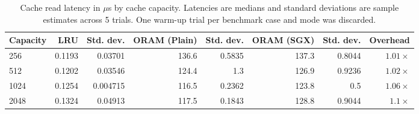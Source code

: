 \begin{table}
\centering
\small
\setlength{\tabcolsep}{4pt}
\begin{tabular}{lrrrrrrr}
\toprule
Capacity & LRU & Std. dev. & ORAM (Plain) & Std. dev. & ORAM (SGX) & Std. dev. & Overhead \\
\midrule
256 & 0.1193 & 0.03701 & 136.6 & 0.5835 & 137.3 & 0.8044 & $1.01\times$ \\
512 & 0.1202 & 0.03546 & 124.4 & 1.3 & 126.9 & 0.9236 & $1.02\times$ \\
1024 & 0.1254 & 0.004715 & 116.5 & 0.2362 & 123.8 & 0.5 & $1.06\times$ \\
2048 & 0.1324 & 0.04913 & 117.5 & 0.1843 & 128.8 & 0.9044 & $1.1\times$ \\
\bottomrule
\end{tabular}
\caption{Cache read latency in ${}\mu$s by cache capacity. Latencies are medians and standard deviations are sample estimates across 5 trials. One warm-up trial per benchmark case and mode was discarded.}
\label{tab:reproduction-table5}
\end{table}
